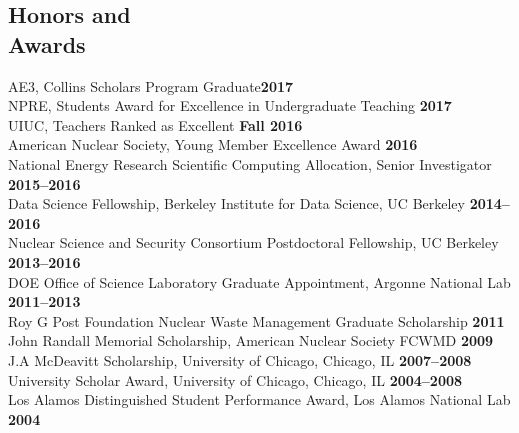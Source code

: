 \documentclass[margin,line]{resume}
\begin{document}
\begin{resume}
    \section{\mysidestyle Honors and\\Awards}
                AE3, Collins Scholars Program Graduate\hfill \textbf{2017}\vspace{.5mm}\\%
                NPRE, Students Award for Excellence in Undergraduate Teaching \hfill \textbf{2017}\vspace{.5mm}\\%
                UIUC, Teachers Ranked as Excellent \hfill \textbf{Fall 2016}\vspace{.5mm}\\%
                American Nuclear Society, Young Member Excellence Award                         \hfill \textbf{2016}\vspace{.5mm}\\%
                National Energy Research Scientific Computing Allocation, Senior Investigator     \hfill \textbf{2015--2016}\vspace{.5mm}\\%
                Data Science Fellowship, Berkeley Institute for Data Science, UC Berkeley     \hfill \textbf{2014--2016}\vspace{.5mm}\\%
                Nuclear Science and Security Consortium Postdoctoral Fellowship, UC Berkeley  \hfill \textbf{2013--2016}\vspace{.5mm}\\%
		DOE Office of Science Laboratory Graduate Appointment, Argonne National Lab   \hfill \textbf{2011--2013}\vspace{.5mm}\\%
		Roy G  Post Foundation Nuclear Waste Management Graduate Scholarship                \hfill \textbf{2011}\vspace{.5mm}\\%
		John Randall Memorial Scholarship, American Nuclear Society FCWMD                   \hfill \textbf{2009}\vspace{.5mm}\\%
		J.A  McDeavitt Scholarship, University of Chicago, Chicago, IL                 \hfill\textbf{2007--2008}\vspace{.5mm}\\%
		University Scholar Award, University of Chicago, Chicago, IL                   \hfill\textbf{2004--2008}\vspace{.5mm}\\%
		Los Alamos Distinguished Student Performance Award, Los Alamos National Lab                         \hfill\textbf{2004}%

\end{resume}
\end{document}
